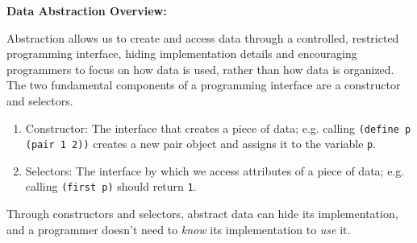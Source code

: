 \textbf{Data Abstraction Overview:}

Abstraction allows us to create and access data through a controlled, restricted programming interface, hiding implementation details and encouraging programmers to focus on how data is used, rather than how data is organized. The two fundamental components of a programming interface are a constructor and selectors.
\begin{enumerate}
	\item Constructor: The interface that creates a piece of data; e.g. calling \texttt{(define p (pair 1 2))} creates a new pair object and assigns it to the variable \texttt{p}.
	\item Selectors: The interface by which we access attributes of a piece of data; e.g. calling \lstinline{(first p)} should return \lstinline{1}.
\end{enumerate}

Through constructors and selectors, abstract data can hide its implementation, and a programmer doesn’t need to {\it know} its implementation to {\it use} it.